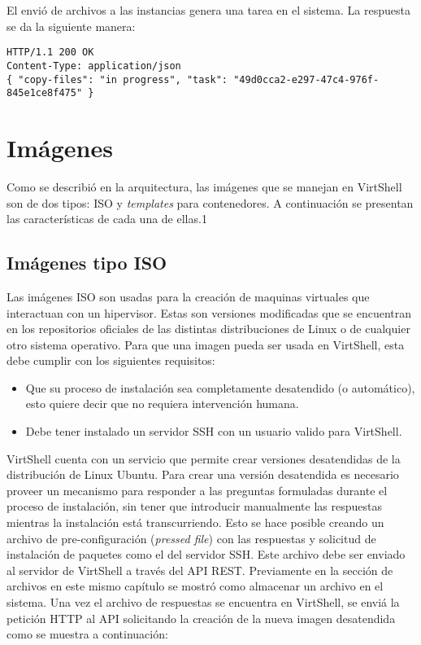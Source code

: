 \vspace{5mm}

El envió de archivos a las instancias genera una tarea en el sistema. La respuesta se da la siguiente manera:

\vspace{5mm}

\begin{lstlisting}[style=json, caption=Ejemplo de respuesta HTTP para el envio de archivos]
HTTP/1.1 200 OK
Content-Type: application/json
{ "copy-files": "in progress", "task": "49d0cca2-e297-47c4-976f-845e1ce8f475" }
\end{lstlisting}

\section{Imágenes}
Como se describió en la arquitectura, las imágenes que se manejan en VirtShell son de dos tipos: ISO y \emph{templates} para contenedores. A continuación se presentan las características de cada una de ellas.1

\subsection{Imágenes tipo ISO}
Las imágenes ISO son usadas para la creación de maquinas virtuales que interactuan con un hipervisor. Estas son versiones modificadas que se encuentran en los repositorios oficiales de las distintas distribuciones de Linux o de cualquier otro sistema operativo. Para que una imagen pueda ser usada en VirtShell, esta debe cumplir con los siguientes requisitos: 
\begin{itemize}
\item Que su proceso de instalación sea completamente desatendido (o automático), esto quiere decir que no requiera intervención humana.
\item Debe tener instalado un servidor SSH con un usuario valido para VirtShell.
\end{itemize}

VirtShell cuenta con un servicio que permite crear versiones desatendidas de la distribución de Linux Ubuntu. Para crear una versión desatendida es necesario proveer un mecanismo para responder a las preguntas formuladas durante el proceso de instalación, sin tener que introducir manualmente las respuestas mientras la instalación está transcurriendo. Esto se hace posible creando un archivo de pre-configuración (\emph{pressed file}) con las respuestas y solicitud de instalación de paquetes como el del servidor SSH. Este archivo debe ser enviado al servidor de VirtShell a través del API REST. Previamente en la sección de archivos en este mismo capítulo se mostró como almacenar un archivo en el sistema. Una vez el archivo de respuestas se encuentra en VirtShell, se enviá la petición HTTP al API solicitando la creación de la nueva imagen desatendida como se muestra a continuación:

